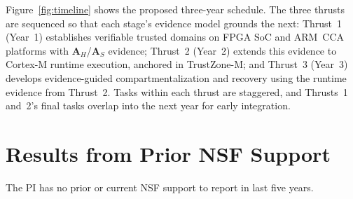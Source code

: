 Figure~\ref{fig:timeline} shows the proposed three-year schedule.
The three thrusts are sequenced so that each stage's evidence model grounds the next: Thrust~1 (Year~1) establishes verifiable trusted domains on FPGA SoC and ARM~CCA platforms with $\mathbf{A}_H$/$\mathbf{A}_S$ evidence; Thrust~2 (Year~2) extends this evidence to Cortex-M runtime execution, anchored in TrustZone-M; and Thrust~3 (Year~3) develops evidence-guided compartmentalization and recovery using the runtime evidence from Thrust~2.
Tasks within each thrust are staggered, and Thrusts~1 and~2's final tasks overlap into the next year for early integration.

\section{Results from Prior NSF Support}
The PI has no prior or current NSF support to report in last five years.